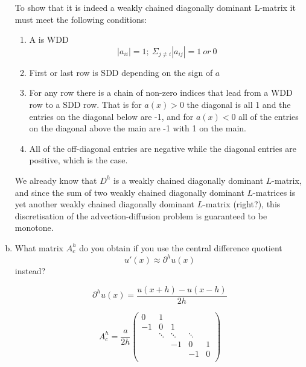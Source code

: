 \documentclass[10pt,letterpaper]{scrartcl}
\begin{document}
\begin{enumerate}[(a)]
\newpage

To show that it is indeed a weakly chained diagonally dominant L-matrix it must meet the following conditions:
\begin{enumerate}[(1)]
    \item A is WDD
    \begin{equation*}
    |a_{ii}| = 1; \: \Sigma_{j\ne i}|a_{ij}| = 1\: or\: 0
    \end{equation*}
    \item First or last row is SDD depending on the sign of $a$
    \item For any row there is a chain of non-zero indices that lead from a WDD row to a SDD row. That is for $a(x) > 0$ the diagonal is all 1 and the entries on the diagonal below are -1, and for $a(x) < 0$ all of the entries on the diagonal above the main are -1 with 1 on the main.
    \item All of the off-diagonal entries are negative while the diagonal entries are positive, which is the case.
\end{enumerate}

\mbox{}
\vfill

We already know that $D^h$ is a weakly chained diagonally dominant $L$-matrix, and since the sum of two weakly chained diagonally dominant $L$-matrices is yet another weakly chained diagonally dominant $L$-matrix (right?), this discretisation of the advection-diffusion problem is guaranteed to be monotone.

\newpage

\item What matrix $A^h_c$ do you obtain if you use the central difference quotient
\begin{equation*}
u'(x) \approx \partial^h u(x)
\end{equation*}
instead?

\begin{equation*}
    \partial^h u(x) = \frac{u(x+h) - u(x-h)}{2h}
\end{equation*}

\begin{equation*}
A^h_c = \frac{a}{2h} \left(
\begin{array}{ccccc}
0 & 1\\
-1 & 0 & 1\\
& \ddots & \ddots & \ddots\\
& & -1 & 0 & 1\\
& & & -1 & 0\\
\end{array}
\right)
\end{equation*}



\end{enumerate}
\end{document}
